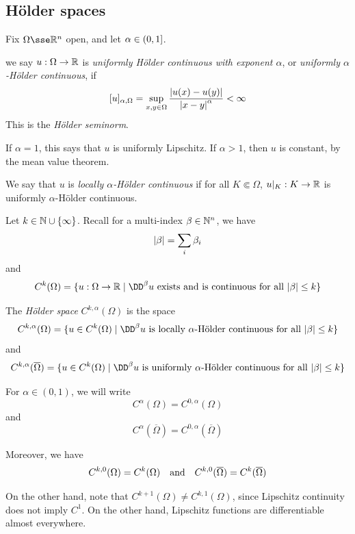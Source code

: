 \documentclass{article}
\begin{document}
\subsection{H\"older spaces}

Fix \(\Omega \sse \R^n\) open, and let \(\alpha \in (0, 1]\).

\begin{definition}
    we say \(u : \Omega \to \mathbb{R}\) is \emph{uniformly H\"older continuous with exponent \(\alpha\)}, or \emph{uniformly \(\alpha\)-H\"older continuous}, if
    \[[u]_{\alpha, \Omega} = \sup_{x, y \in \Omega}\frac{\abs{u(x) - u(y)}}{\abs{x - y}^\alpha} < \infty\]
    This is the \emph{H\"older seminorm}.
\end{definition}

If \(\alpha = 1\), this says that \(u\) is uniformly Lipschitz. If \(\alpha > 1\), then \(u\) is constant, by the mean value theorem.

\begin{definition}
    We say that \(u\) is \emph{locally \(\alpha\)-H\"older continuous} if for all \(K \Subset \Omega\), \(u\vert_K : K \to \mathbb{R}\) is uniformly \(\alpha\)-H\"older continuous.
\end{definition}

Let \(k \in \mathbb{N} \cup \{\infty\}\). Recall for a multi-index \(\beta \in \mathbb{N}^n\), we have
\[\abs{\beta} = \sum_i \beta_i\]
and
\[C^k(\Omega) = \{u : \Omega \to \R \mid \DD^\beta u\text{ exists and is continuous for all }\abs{\beta} \le k\}\]

\begin{definition}
    The \emph{H\"older space} \(C^{k, \alpha}(\Omega)\) is the space
    \[C^{k, \alpha}(\Omega) = \{u \in C^k(\Omega) \mid \DD^\beta u \text{ is locally \(\alpha\)-H\"older continuous for all }\abs{\beta} \le k\}\]
    and
    \[C^{k, \alpha}(\overline\Omega) = \{u \in C^k(\Omega) \mid \DD^\beta u \text{ is uniformly \(\alpha\)-H\"older continuous for all }\abs{\beta} \le k\}\] 
\end{definition}

For \(\alpha \in (0, 1)\), we will write
\[C^\alpha(\Omega) = C^{0, \alpha}(\Omega)\]
and
\[C^\alpha(\overline\Omega) = C^{0, \alpha}(\overline\Omega)\]

Moreover, we have
\[C^{k, 0}(\Omega) = C^k(\Omega) \qqtext{and} C^{k, 0}(\overline\Omega) = C^k(\overline\Omega)\]

\begin{remark}
    On the other hand, note that \(C^{k+1}(\Omega) \ne C^{k, 1}(\Omega)\), since Lipschitz continuity does not imply \(C^1\). On the other hand, Lipschitz functions are differentiable almost everywhere.
\end{remark}
\end{document}
